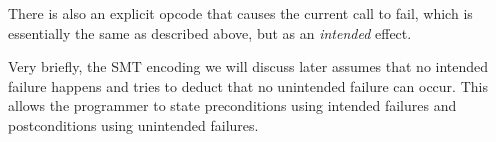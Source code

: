 There is also an explicit opcode that causes the current call to fail, which is
essentially the same as described above, but as an \emph{intended} effect.


Very briefly, the SMT encoding we will discuss later assumes that no intended failure happens
and tries to deduct that no unintended failure can occur. This allows the
programmer to state preconditions using intended failures and postconditions
using unintended failures.
